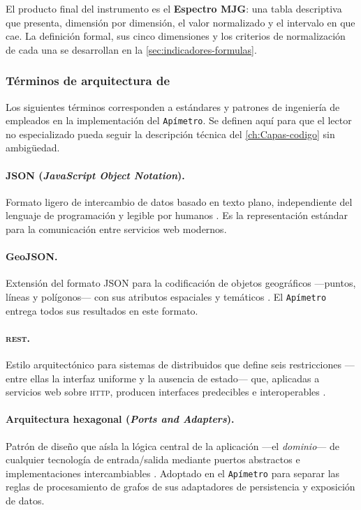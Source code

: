 El producto final del instrumento es el \textbf{Espectro MJG}: una tabla
descriptiva que presenta, dimensión por dimensión, el valor normalizado y el
intervalo en que cae. La definición formal, sus cinco dimensiones y los
criterios de normalización de cada una se desarrollan en la
\autoref{sec:indicadores-formulas}.

\subsubsection*{Términos de arquitectura de \texorpdfstring{}{software}}
\label{subsubsec:glosario-software}

Los siguientes términos corresponden a estándares y patrones de ingeniería de
 empleados en la implementación del \texttt{Apímetro}. Se definen aquí para que
el lector no especializado pueda seguir la descripción técnica del
\autoref{ch:Capas-codigo} sin ambigüedad.

\paragraph{JSON (\textit{JavaScript Object Notation}).}
Formato ligero de intercambio de datos basado en texto plano, independiente del
lenguaje de programación y legible por humanos \citep{bray2017json}. Es la
representación estándar para la comunicación entre servicios web modernos.

\paragraph{GeoJSON.}
Extensión del formato JSON para la codificación de objetos geográficos
---puntos, líneas y polígonos--- con sus atributos espaciales y temáticos
\citep{butler2016geojson}. El \texttt{Apímetro} entrega todos sus resultados en este
formato.

\paragraph{\api{} \textsc{rest}.}
Estilo arquitectónico para sistemas de  distribuidos que define seis
restricciones ---entre ellas la interfaz uniforme y la ausencia de estado---
que, aplicadas a servicios web sobre \textsc{http}, producen interfaces
predecibles e interoperables \citep{fielding2000rest}.

\paragraph{Arquitectura hexagonal (\textit{Ports and Adapters}).}
Patrón de diseño que aísla la lógica central de la aplicación ---el
\textit{dominio}--- de cualquier tecnología de entrada/salida mediante puertos
abstractos e implementaciones intercambiables \citep{cockburn2005hexagonal}.
Adoptado en el \texttt{Apímetro} para separar las reglas de procesamiento de grafos de
sus adaptadores de persistencia y exposición de datos.

